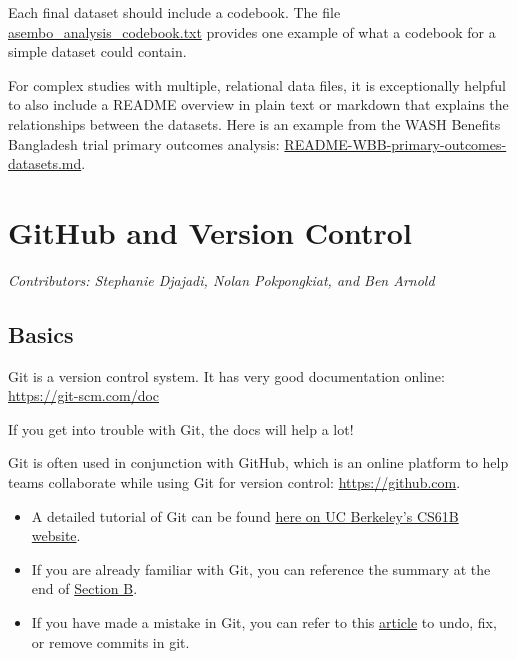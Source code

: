 \documentclass[]{book}
\providecommand{\tightlist}{%
  \setlength{\itemsep}{0pt}\setlength{\parskip}{0pt}}
\begin{document}
Each final dataset should include a codebook. The file \href{https://github.com/ben-arnold/enterics-seroepi/blob/master/data/asembo_analysis_codebook.txt}{asembo\_analysis\_codebook.txt} provides one example of what a codebook for a simple dataset could contain.

For complex studies with multiple, relational data files, it is exceptionally helpful to also include a README overview in plain text or markdown that explains the relationships between the datasets. Here is an example from the WASH Benefits Bangladesh trial primary outcomes analysis: \href{https://osf.io/v3nfs/}{README-WBB-primary-outcomes-datasets.md}.

\hypertarget{github}{%
\chapter{GitHub and Version Control}\label{github}}

\emph{Contributors: Stephanie Djajadi, Nolan Pokpongkiat, and Ben Arnold}

\hypertarget{basics}{%
\section{Basics}\label{basics}}

Git is a version control system. It has very good documentation online: \url{https://git-scm.com/doc}

If you get into trouble with Git, the docs will help a lot!

Git is often used in conjunction with GitHub, which is an online platform to help teams collaborate while using Git for version control: \url{https://github.com}.

\begin{itemize}
\tightlist
\item
  A detailed tutorial of Git can be found \href{https://sp19.datastructur.es/materials/guides/using-git\#b-local-repositories-narrative-introduction}{here on UC Berkeley's CS61B website}.
\item
  If you are already familiar with Git, you can reference the summary at the end of \href{https://sp19.datastructur.es/materials/guides/using-git\#b-local-repositories-narrative-introduction}{Section B}.
\item
  If you have made a mistake in Git, you can refer to this \href{https://sethrobertson.github.io/GitFixUm/fixup.html}{article} to undo, fix, or remove commits in git.
\end{itemize}
\end{document}
